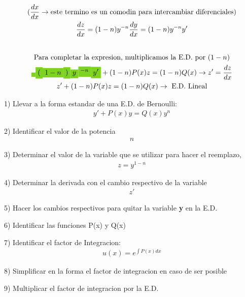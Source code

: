 \documentclass{article}
\begin{document}
\begin{gather*}
(\frac{dx}{dx} \rightarrow \text{este termino es un comodin para intercambiar diferenciales}) \\
\frac{dz}{dx} = (1-n)y^{-n}\frac{dy}{dx} =  (1-n)y^{-n}y' \\
\vspace{0.5em} \\
\text{Para completar la expresion, multiplicamos la E.D. por }(1-n) \\
\text{\colorbox[RGB]{126,211,33}{$ $}}\text{\colorbox[RGB]{126,211,33}{$($}}\text{\colorbox[RGB]{126,211,33}{$1-n$}}\text{\colorbox[RGB]{126,211,33}{$)$}}\text{\colorbox[RGB]{126,211,33}{$y$}}\text{\colorbox[RGB]{126,211,33}{$^{-n}$}}\text{\colorbox[RGB]{126,211,33}{$y'$}}+ (1-n)P(x)z= (1-n)Q(x)   \rightarrow z' = \frac{dz}{dx} \\
z'+(1-n)P(x)z= (1-n)Q(x) \rightarrow \text{ E.D. Lineal}
\end{gather*}








1) Llevar a la forma estandar de una E.D. de Bernoulli: 
\begin{gather*}
y'+P(x)y=Q(x)y^{n}
\end{gather*}


2) Identificar el valor de la potencia 
\begin{gather*}
n
\end{gather*}


3) Determinar el valor de la variable que se utilizar para hacer el reemplazo, 
\begin{gather*}
z=y^{1-n} 
\end{gather*}


4) Determinar la derivada con el cambio respectivo de la variable 
\begin{gather*}
z'
\end{gather*}


5) Hacer los cambios respectivos para quitar la variable \textbf{y} en la E.D. 

6) Identificar las funciones P(x) y Q(x) 

7) Identificar el factor de Integracion: 
\begin{gather*}
u(x) = e^{\int P(x)dx}
\end{gather*}


8) Simplificar en la forma el factor de integracion en caso de ser posible

9) Multiplicar el factor de integracion por la E.D. 
\end{document}
